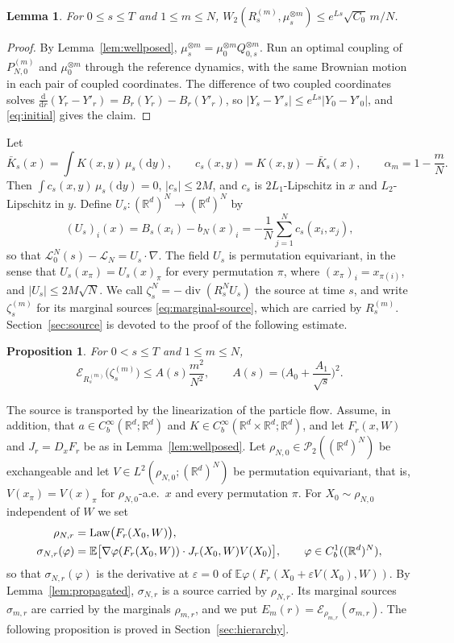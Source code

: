 \documentclass[11pt]{amsart}
\numberwithin{equation}{section}
\theoremstyle{plain}
\newtheorem{proposition}[theorem]{Proposition}
\newtheorem{lemma}[theorem]{Lemma}
\theoremstyle{remark}
\newcommand{\R}{\mathbb{R}}
\newcommand{\E}{\mathbb{E}}
\newcommand{\cP}{\mathcal{P}}
\newcommand{\cE}{\mathcal{E}}
\newcommand{\cL}{\mathcal{L}}
\newcommand{\W}{W_2}
\newcommand{\Law}{\mathrm{Law}}
\newcommand{\dd}{\mathrm{d}}
\DeclareMathOperator{\dv}{div}
\begin{document}
\begin{lemma}\label{lem:reference-W}
For $0\le s\le T$ and $1\le m\le N$, $\W(R^{(m)}_s,\mu_s^{\otimes m})\le e^{Ls}\sqrt{C_0}\,m/N$.
\end{lemma}

\begin{proof}
By Lemma~\ref{lem:wellposed}, $\mu_s^{\otimes m}=\mu_0^{\otimes m}Q_{0,s}^{\otimes m}$. Run an optimal coupling of $P^{(m)}_{N,0}$ and $\mu_0^{\otimes m}$ through the reference dynamics, with the same Brownian motion in each pair of coupled coordinates. The difference of two coupled coordinates solves $\frac{\dd}{\dd r}(Y_r-Y'_r)=B_r(Y_r)-B_r(Y'_r)$, so $|Y_s-Y'_s|\le e^{Ls}|Y_0-Y'_0|$, and \eqref{eq:initial} gives the claim.
\end{proof}

Let
\[
\bar K_s(x)=\int K(x,y)\,\mu_s(\dd y),\qquad c_s(x,y)=K(x,y)-\bar K_s(x),\qquad \alpha_m=1-\frac mN.
\]
Then $\int c_s(x,y)\,\mu_s(\dd y)=0$, $|c_s|\le2M$, and $c_s$ is $2L_1$-Lipschitz in $x$ and $L_2$-Lipschitz in $y$. Define $U_s\colon(\R^d)^N\to(\R^d)^N$ by
\begin{equation}\label{eq:U}
(U_s)_i(x)=B_s(x_i)-b_N(x)_i=-\frac1N\sum_{j=1}^Nc_s(x_i,x_j),
\end{equation}
so that $\cL^N_0(s)-\cL_N=U_s\cdot\nabla$. The field $U_s$ is permutation equivariant, in the sense that $U_s(x_\pi)=U_s(x)_\pi$ for every permutation $\pi$, where $(x_\pi)_i=x_{\pi(i)}$, and $|U_s|\le2M\sqrt N$. We call $\zeta^N_s=-\dv(R^N_sU_s)$ the source at time $s$, and write $\zeta^{(m)}_s$ for its marginal sources \eqref{eq:marginal-source}, which are carried by $R^{(m)}_s$. Section~\ref{sec:source} is devoted to the proof of the following estimate.

\begin{proposition}\label{prop:source}
For $0<s\le T$ and $1\le m\le N$,
\[
\cE_{R^{(m)}_s}\big(\zeta^{(m)}_s\big)\le A(s)\frac{m^2}{N^2},\qquad A(s)=\Big(A_0+\frac{A_1}{\sqrt s}\Big)^2.
\]
\end{proposition}

The source is transported by the linearization of the particle flow. Assume, in addition, that $a\in C^\infty_b(\R^d;\R^d)$ and $K\in C^\infty_b(\R^d\times\R^d;\R^d)$, and let $F_r(x,W)$ and $J_r=D_xF_r$ be as in Lemma~\ref{lem:wellposed}. Let $\rho_{N,0}\in\cP_2((\R^d)^N)$ be exchangeable and let $V\in L^2(\rho_{N,0};(\R^d)^N)$ be permutation equivariant, that is, $V(x_\pi)=V(x)_\pi$ for $\rho_{N,0}$-a.e.\ $x$ and every permutation $\pi$. For $X_0\sim\rho_{N,0}$ independent of $W$ we set
\begin{align}
\rho_{N,r}&=\Law\big(F_r(X_0,W)\big),\label{eq:propagated}\\
\sigma_{N,r}(\varphi)&=\E\big[\nabla\varphi(F_r(X_0,W))\cdot J_r(X_0,W)V(X_0)\big],\qquad\varphi\in C^1_b((\R^d)^N),\notag
\end{align}
so that $\sigma_{N,r}(\varphi)$ is the derivative at $\varepsilon=0$ of $\E\varphi(F_r(X_0+\varepsilon V(X_0),W))$. By Lemma~\ref{lem:propagated}, $\sigma_{N,r}$ is a source carried by $\rho_{N,r}$. Its marginal sources $\sigma_{m,r}$ are carried by the marginals $\rho_{m,r}$, and we put $E_m(r)=\cE_{\rho_{m,r}}(\sigma_{m,r})$. The following proposition is proved in Section~\ref{sec:hierarchy}.
\end{document}

